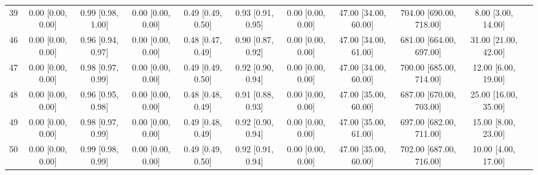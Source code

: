 \documentclass[8pt]{article}
\begin{document}
\begin{center}
\begin{footnotesize}
\begin{longtable}{|ccccccccccc|}
 39 &  0.00 [0.00, 0.00] &  0.99 [0.98, 1.00] &  0.00 [0.00, 0.00] &  0.49 [0.49, 0.50] &  0.93 [0.91, 0.95] &     0.00 [0.00, 0.00] &  47.00 [34.00, 60.00] &  704.00 [690.00, 718.00] &       8.00 [3.00, 14.00] \\
 46 &  0.00 [0.00, 0.00] &  0.96 [0.94, 0.97] &  0.00 [0.00, 0.00] &  0.48 [0.47, 0.49] &  0.90 [0.87, 0.92] &     0.00 [0.00, 0.00] &  47.00 [34.00, 61.00] &  681.00 [664.00, 697.00] &     31.00 [21.00, 42.00] \\
 47 &  0.00 [0.00, 0.00] &  0.98 [0.97, 0.99] &  0.00 [0.00, 0.00] &  0.49 [0.49, 0.50] &  0.92 [0.90, 0.94] &     0.00 [0.00, 0.00] &  47.00 [34.00, 60.00] &  700.00 [685.00, 714.00] &      12.00 [6.00, 19.00] \\
 48 &  0.00 [0.00, 0.00] &  0.96 [0.95, 0.98] &  0.00 [0.00, 0.00] &  0.48 [0.48, 0.49] &  0.91 [0.88, 0.93] &     0.00 [0.00, 0.00] &  47.00 [35.00, 60.00] &  687.00 [670.00, 703.00] &     25.00 [16.00, 35.00] \\
 49 &  0.00 [0.00, 0.00] &  0.98 [0.97, 0.99] &  0.00 [0.00, 0.00] &  0.49 [0.48, 0.49] &  0.92 [0.90, 0.94] &     0.00 [0.00, 0.00] &  47.00 [35.00, 61.00] &  697.00 [682.00, 711.00] &      15.00 [8.00, 23.00] \\
 50 &  0.00 [0.00, 0.00] &  0.99 [0.98, 0.99] &  0.00 [0.00, 0.00] &  0.49 [0.49, 0.50] &  0.92 [0.91, 0.94] &     0.00 [0.00, 0.00] &  47.00 [35.00, 60.00] &  702.00 [687.00, 716.00] &      10.00 [4.00, 17.00] \\
\end{longtable}
\end{footnotesize}
\end{center}
\end{document}
